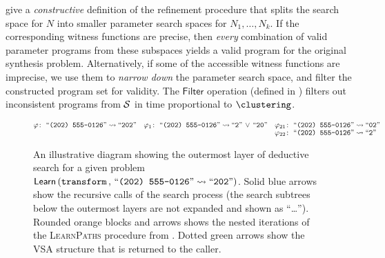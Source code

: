  give a \emph{constructive} definition of the refinement procedure that splits the
search space for $N$ into smaller parameter search spaces for $N_1,\dots,N_k$.
If the corresponding witness functions are precise, then \emph{every} combination of valid parameter programs from these
subspaces yields a valid program for the original synthesis problem.
Alternatively, if some of the accessible witness functions are imprecise, we use them to \emph{narrow down} the
parameter search space, and filter the constructed program set for validity.
The $\mathsf{Filter}$ operation (defined in ) filters out inconsistent programs from $\mathcal{S}$ in time
proportional to $\clustering$.

\begin{sidewaysfigure}[p!]
    \begin{fullpage}
        \centering
        
        \large
        \vspace*{-\baselineskip}
        \begin{equation*}
            \spec\colon\ \stringliteral{(202) 555-0126} \tospec \stringliteral{202}
            \quad
            \spec_1\colon\ \stringliteral{(202) 555-0126} \tospec \stringliteral{2} \,\vee\, \stringliteral{20}
            \quad
            \begin{aligned}[t]
                &\spec_{21}\colon\ \stringliteral{(202) 555-0126} \tospec \stringliteral{02} \\[-0.3\baselineskip]
                &\spec_{22}\colon\ \stringliteral{(202) 555-0126} \tospec \stringliteral{2}
            \end{aligned}
        \end{equation*}
        \caption{An illustrative diagram showing the outermost layer of deductive search for a given problem
        $\mathsf{Learn}\left(\mathtt{transform}\,,\, \stringliteral{(202) 555-0126} \tospec \stringliteral{202}\right)$.
        Solid blue arrows show the recursive calls of the search process (the search subtrees below the outermost layers
        are not expanded and shown as ``\dots'').
        Rounded orange blocks and arrows shows the nested iterations of the \textsc{LearnPaths} procedure from
        .
        Dotted green arrows show the VSA structure that is returned to the caller.}
        \label{fig:prose:algorithm:example}
    \end{fullpage}
\end{sidewaysfigure}

